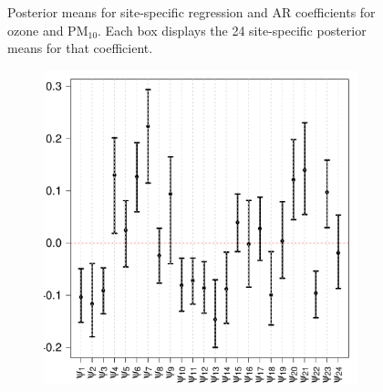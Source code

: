 \documentclass[alpha-refs]{wiley-article}
\begin{document}
\begin{figure}[H]
\begin{center}
\begin{subfigure}[b]{.35\textwidth}
   \end{subfigure}
  \end{center}
  \vspace{-4mm}
       \caption{Posterior means for site-specific regression and AR coefficients for ozone and $\text{PM}_{10}$. Each box displays the 24 site-specific posterior means for that coefficient.}\label{fig:post_coef_box}
\end{figure}
\vspace{-6mm}
\begin{figure}[H]
  \begin{center}
   \begin{subfigure}[b]{.35\textwidth}
      \includegraphics[width=\textwidth]{psi1}
   \end{subfigure}
     \begin{subfigure}[b]{.35\textwidth}

\end{subfigure}
\end{center}
\end{figure}
\end{document}
